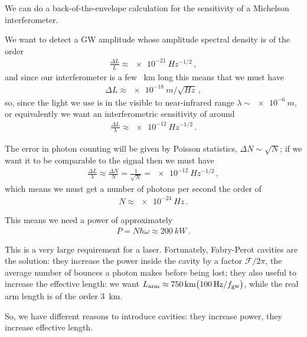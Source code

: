 \documentclass[main.tex]{subfiles}
\begin{document}
We can do a back-of-the-envelope calculation for the sensitivity of a Michelson interferometer.

We want to detect a GW amplitude whose amplitude spectral density is of the order 
%
\begin{align}
\frac{ \Delta L}{L} \approx \SI{e-21}{Hz^{-1/2}}
\,,
\end{align}
%
and since our interferometer is a few \SI{}{km} long this means that we must have 
%
\begin{align}
\Delta L \approx \SI{e-18}{m / \sqrt{Hz}}
\,,
\end{align}
%
so, since the light we use is in the visible to near-infrared range \(\lambda \sim \SI{e-6}{m}\), or equivalently  we want an interferometric sensitivity of around 
%
\begin{align}
\frac{\Delta L}{\lambda } \approx \SI{e-12}{Hz^{-1/2}}
\,.
\end{align}

The error in photon counting will be given by Poisson statistics, \(\Delta N \sim \sqrt{N}\); if we want it to be comparable to the signal then we must have 
%
\begin{align}
\frac{\Delta L}{\lambda } \approx \frac{\Delta N}{N} = \frac{1}{\sqrt{N}} = \SI{e-12}{Hz^{-1/2}}
\,,
\end{align}
%
which means we must get a number of photons per second the order of 
%
\begin{align}
N \approx \SI{e-24}{Hz}
\,.
\end{align}

This means we need a power of approximately 
%
\begin{align}
P = N \hbar \omega \approx \SI{200}{kW}
\,.
\end{align}

This is a very large requirement for a laser.
Fortunately, Fabry-Perot cavities are the solution: they increase the power inside the cavity by a factor \(\mathcal{F} / 2 \pi \), the average number of bounces a photon makes before being lost; they also useful to increase the effective length: we want \(L _{\text{arm}} \approx \SI{750}{km} \qty( \SI{100}{Hz}  / f _{\text{gw}})\), while the real arm length is of the order \SI{3}{km}. 

So, we have different reasons to introduce cavities: they increase power, they increase effective length. 
\end{document}
